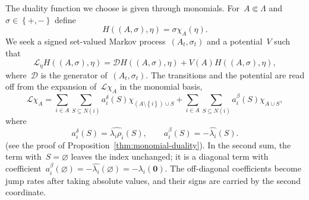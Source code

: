 \documentclass[EJP,preprint,NODS,nobera]{ejpecp}
\newcommand{\bb}[1]{\left(#1\right)}
\newcommand{\cb}[1]{\left\{#1\right\}}
\newcommand{\mb}[1]{\mathbf{#1}}
\newcommand{\Lcal}{\mathcal{L}}
\newcommand{\Dcal}{\mathcal{D}}
\newcommand{\chg}[1]{{\color{changegreen}#1}}
\begin{document}
The duality function we choose is given through monomials. For~$A\Subset\Lambda$ and~$\sigma\in\cb{+,-}$  define
\begin{equation}
\label{eq:monomial-duality-function}
H((A,\sigma),\eta)
=
\sigma\chi_A(\eta).
\end{equation}
We seek a signed set-valued Markov process~$(A_t,\sigma_t)$ and a potential~$V$
such that
\begin{equation}
\label{eq:monomial-generator-duality}
\Lcal_\eta H((A,\sigma),\eta)
=
\Dcal H((A,\sigma),\eta)
+
V(A)H((A,\sigma),\eta),
\end{equation}
where~$\Dcal$ is the generator of~$(A_t,\sigma_t)$. \chg{The transitions and the
potential are read off from the expansion of~$\Lcal\chi_A$ in the monomial
basis,}
\begin{equation}
\label{eq:signed-dual-generator-expansion}
\Lcal\chi_A
=
\sum_{i\in A}\sum_{S\subseteq N(i)}
a_i^\delta(S)\chi_{\bb{A\setminus\cb{i}}\cup S}
+
\sum_{i\in A}\sum_{S\subseteq N(i)}
a_i^\beta(S)\chi_{A\cup S},
\end{equation}
where
\begin{equation}
\label{eq:signed-dual-coefficients}
a_i^\delta(S)
=
\widehat{\lambda_i\rho_i}(S),
\qquad
a_i^\beta(S)
=
-\widehat{\lambda_i}(S).
\end{equation}
\chg{(see the proof of Proposition~\ref{thm:monomial-duality}). In the second
sum, the term with~$S=\varnothing$ leaves the index unchanged; it is a diagonal
term with coefficient~$a_i^\beta(\varnothing)=-\widehat{\lambda_i}(\varnothing)
=-\lambda_i(\mb 0)$. The off-diagonal coefficients become jump rates after
taking absolute values, and their signs are carried by the second coordinate.}
\end{document}
